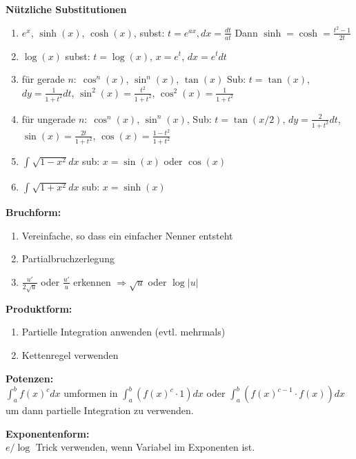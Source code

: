 \begin{tcolorbox}
    \textbf{Nützliche Substitutionen}
    \begin{enumerate}[label = (\arabic*)]
        \item{$e^x$, $\sinh(x)$, $\cosh(x)$, subst: $t = e^{ax}, dx = \frac{dt}{at}$ Dann $\sinh=\cosh=\frac{t^2 -1}{2t}$}
        \item{$\log(x)$ subst: $t = \log(x)$, $x = e^t$, $dx = e^t dt$}
        \item{für gerade $n: \; \cos^n (x)$, $\sin^n(x)$, $\tan(x)$ Sub: $t = \tan(x)$, $dy = \frac{1}{1+t^2} dt$, $\sin^2(x) = \frac{t^2}{1+t^2}$, $\cos^2 (x) = \frac{1}{1+t^2}$}
        \item{für ungerade $n: \; \cos^n (x)$, $\sin^n(x)$, Sub: $t = \tan(x/2)$, $dy = \frac{2}{1+t^2} dt$, $\sin(x) = \frac{2t}{1+t^2}$, $\cos (x) = \frac{1 - t^2}{1+t^2}$}
        \item{$\int_{}^{} \sqrt{1-x^2} dx$ sub: $x=\sin(x)$ oder $\cos(x)$}
        \item{$\int_{}^{} \sqrt{1+x^2} dx$ sub: $x=\sinh(x)$}
    \end{enumerate}
\end{tcolorbox}



\textbf{Bruchform:}
\begin{enumerate}[label=(\arabic*)]
    \item Vereinfache, so dass ein einfacher Nenner entsteht
    \item Partialbruchzerlegung
    \item \color{blue} $\frac{u'}{2\sqrt{u}}$ oder $\frac{u'}{u}$ erkennen $\Rightarrow \sqrt{u}$ oder $\log|u|$ \color{black} 
\end{enumerate}

\textbf{Produktform:}
\begin{enumerate}[label=(\arabic*)]
    \item Partielle Integration anwenden (evtl. mehrmals)
    \item Kettenregel verwenden
\end{enumerate}

\textbf{Potenzen:} \smallskip \\
$\int_a^b f(x)^c dx$ umformen in $\int_a^b (f(x)^c \cdot 1) dx$ oder $\int_a^b (f(x)^{c-1} \cdot f(x)) dx$ 
um dann partielle Integration zu verwenden. \smallskip

\textbf{Exponentenform:} \smallskip \\
$e / \log$ Trick verwenden, wenn Variabel im Exponenten ist. \smallskip


